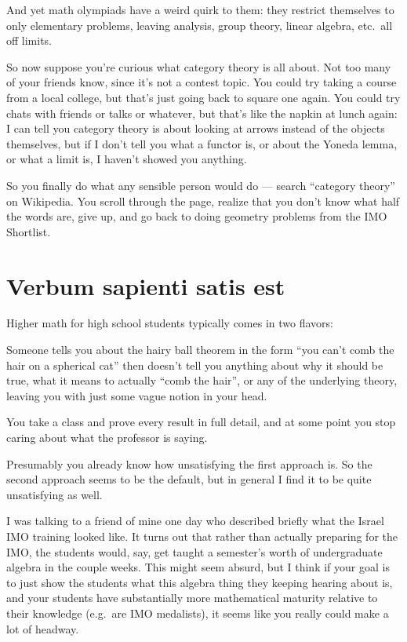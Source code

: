 And yet math olympiads have a weird quirk to them:
they restrict themselves to only elementary problems,
leaving analysis, group theory, linear algebra, etc.\ all off limits.

So now suppose you're curious what category theory is all about.
Not too many of your friends know, since it's not a contest topic.
You could try taking a course from a local college, but that's just going back to square one again.
You could try chats with friends or talks or whatever, but that's like the napkin at lunch again:
I can tell you category theory is about looking at arrows instead of the objects themselves,
but if I don't tell you what a functor is, or about the Yoneda lemma,
or what a limit is, I haven't showed you anything.

So you finally do what any sensible person would do --- search ``category theory'' on Wikipedia.
You scroll through the page, realize that you don't know what half the words are,
give up, and go back to doing geometry problems from the IMO Shortlist.

\section*{Verbum sapienti satis est}
Higher math for high school students typically comes in two flavors:
\begin{itemize}
	\ii Someone tells you about the hairy ball theorem in the form
	``you can't comb the hair on a spherical cat''
	then doesn't tell you anything about why it should be true,
	what it means to actually ``comb the hair'', 
	or any of the underlying theory,
	leaving you with just some vague notion in your head.

	\ii You take a class and prove every result in full detail,
	and at some point
	you stop caring about what the professor is saying.
\end{itemize}
Presumably you already know how unsatisfying the first approach is.
So the second approach seems to be the default,
but in general I find it to be quite unsatisfying as well.

I was talking to a friend of mine one day who described briefly
what the Israel IMO training looked like.
It turns out that rather than actually preparing for the IMO,
the students would, say, get taught a semester's worth of
undergraduate algebra in the couple weeks.
This might seem absurd, but I think if your goal is to just show the students
what this algebra thing they keeping hearing about is,
and your students have substantially more mathematical maturity
relative to their knowledge (e.g.\ are IMO medalists),
it seems like you really could make a lot of headway.

